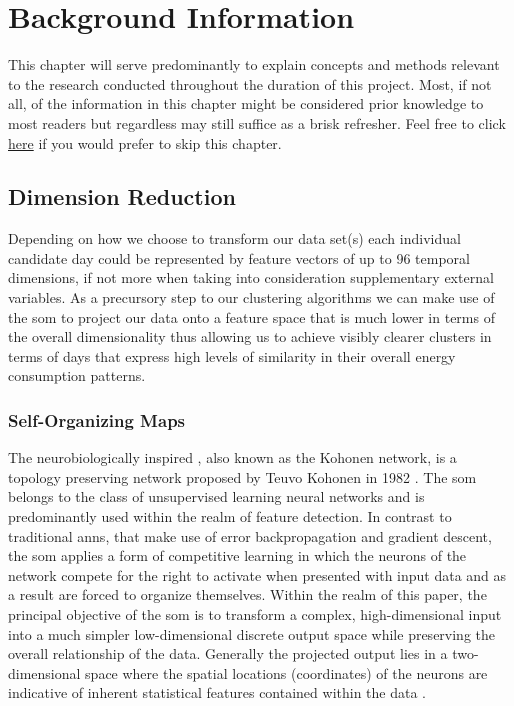 \chapter{Background Information}
\label{ch:Background-Information}
This chapter will serve predominantly to explain concepts and methods relevant to the research conducted throughout the duration of this project. Most, if not all, of the information in this chapter might be considered prior knowledge to most readers but regardless may still suffice as a brisk refresher. Feel free to click \hyperref[ch:Data-Description]{here} if you would prefer to skip this chapter.

\section{Dimension Reduction}
\label{sec:Background-Information:Dimension-Reduction}
Depending on how we choose to transform our data set(s) each individual candidate day could be represented by feature vectors of up to 96 temporal dimensions, if not more when taking into consideration supplementary external variables. As a precursory step to our clustering algorithms we can make use of the \gls{som} to project our data onto a feature space that is much lower in terms of the overall dimensionality thus allowing us to achieve visibly clearer clusters in terms of days that express high levels of similarity in their overall energy consumption patterns.

\subsection{Self-Organizing Maps}
\label{subsec:Background-Information:Self-Organizing-Maps}
The neurobiologically inspired , also known as the Kohonen network, is a topology preserving network proposed by Teuvo Kohonen in 1982 \cite{Kohonen}. The \gls{som} belongs to the class of unsupervised learning neural networks and is predominantly used within the realm of feature detection. In contrast to traditional \glspl{ann}, that make use of error backpropagation and gradient descent, the \gls{som} applies a form of competitive learning in which the neurons of the network compete for the right to activate when presented with input data and as a result are forced to organize themselves. Within the realm of this paper, the principal objective of the \gls{som} is to transform a complex, high-dimensional input into a much simpler low-dimensional discrete output space while preserving the overall relationship of the data. Generally the projected output lies in a two-dimensional space where the spatial locations (\ie coordinates) of the neurons are indicative of inherent statistical features contained within the data \cite{Asan}.

